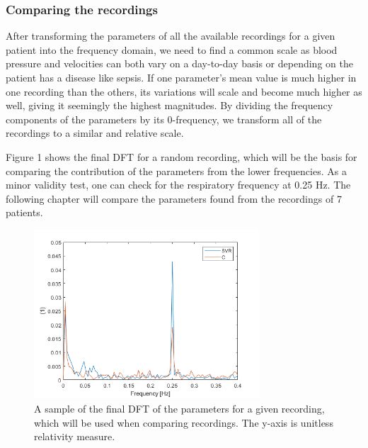 \subsubsection{Comparing the recordings} \label{sect:method_comparing_recordings}
After transforming the parameters of all the available recordings for a given patient into the frequency domain, we need to find a common scale as blood pressure and velocities can both vary on a day-to-day basis or depending on the patient has a disease like sepsis. If one parameter's mean value is much higher in one recording than the others, its variations will scale and become much higher as well, giving it seemingly the highest magnitudes. By dividing the frequency components of the parameters by its 0-frequency, we transform all of the recordings to a similar and relative scale. 

Figure 1 shows the final DFT for a random recording, which will be the basis for comparing the contribution of the parameters from the lower frequencies. As a minor validity test, one can check for the respiratory frequency at 0.25 Hz. The following chapter will compare the parameters found from the recordings of 7 patients.
\begin{figure}[h!]
    \centering
    \includegraphics[width=0.75\textwidth]{fig/methods/final_dft.png}
    \caption{A sample of the final DFT of the parameters for a given recording, which will be used when comparing recordings. The y-axis is unitless relativity measure.}
    \label{fig:final_dft}
\end{figure}{}





\cleardoublepage